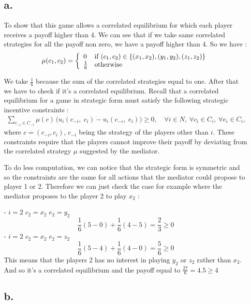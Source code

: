 \subsection*{a.}
To show that this game allows a correlated equilibrium for which each player receives a payoff higher than 4. We can see that if we take same correlated strategies for all the payoff non zero, we have a payoff higher than 4. So we have :
$$ \mu(c_1,c_2) = \left\{ 
\begin{array}{l l}
    0 & \mbox{if} \ (c_1,c_2) \in \left\{(x_1,x_2),(y_1,y_2),(z_1,z_2)\right\}\\                      
     \frac{1}{6} & \mbox{otherwise} 
\end{array} \right.$$

We take $\frac{1}{6}$ because the sum of the correlated strategies equal to one. After that we have to check if it's a correlated equilibrium. Recall that a correlated equilibrium for a game in strategic form must satisfy the following strategic incentive constraints :
\begin{align*}
			\sum_{c_{-i} \in C_{-i}} \mu(c) \, \big( u_i(c_{-i}, \; c_i) - u_i(c_{-i}, \; e_i) \big) \geq 0, \quad \forall i \in N, \ \forall c_i \in C_i, \ \forall e_i \in C_i,
		\end{align*}
		where $c = (c_{-i}, c_i)$, $c_{-i}$ being the strategy of the players other than $i$. These constraints require that the players cannot improve their payoff by deviating from the correlated strategy $\mu$ suggested by the mediator.


To do less computation, we can notice that the strategic form is symmetric and so the constraints are the same for all actions that the mediator could propose to player 1 or 2. Therefore we can just check the case for example where the mediator proposes to the player 2 to play $x_2$ :

- $i=2$ $c_2=x_2$  $e_2=y_2$
\begin{equation*}  
\frac{1}{6}(5-0) + \frac{1}{6}(4-5) = \frac{2}{3} \ge 0 
\end{equation*}
- $i=2$ $c_2=x_2$  $e_2=z_2$
\begin{equation*} 
\frac{1}{6}(5-4) + \frac{1}{6}(4-0) = \frac{5}{6} \ge 0 
\end{equation*}
This means that the players 2 has no interest in playing $y_2$ or $z_2$ rather than $x_2$. And so it's a correlated equilibrium and the payoff equal to $\frac{27}{6} = 4.5 \ge 4$

\subsection*{b.}

